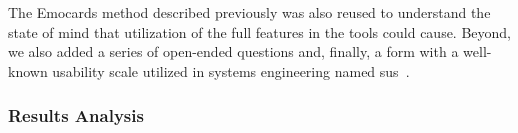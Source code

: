 The Emocards method described previously was also reused to understand the state of mind that utilization of the full features in the tools could cause.
Beyond, we also added a series of open-ended questions and, finally, a form with a well-known usability scale utilized in systems engineering named \ac{sus}~\cite{sus:1995}.
 
\subsubsection{Results Analysis}

